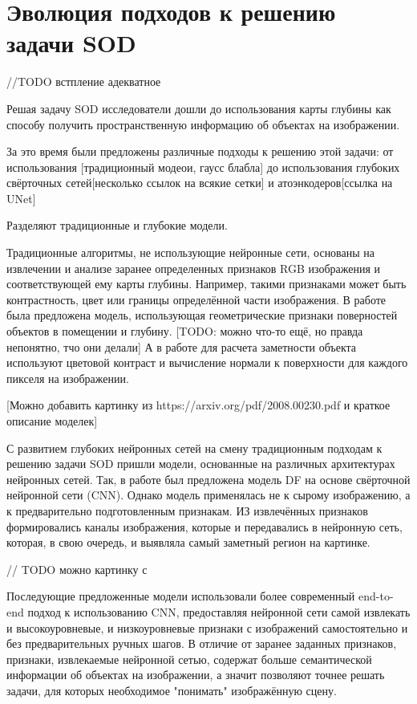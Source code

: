 \section{Эволюция подходов к решению задачи SOD}

//TODO встпление адекватное

Решая задачу SOD исследователи дошли до использования карты глубины как способу получить пространственную информацию об объектах на изображении.

За это время были предложены различные подходы к решению этой задачи: от использования [традиционный модеои, гаусс блабла] до использования глубоких свёрточных сетей[несколько ссылок на всякие сетки] и атоэнкодеров[ссылка на UNet]

Разделяют традиционные и глубокие модели.


Традиционные алгоритмы, не использующие нейронные сети, основаны на извлечении и анализе заранее определенных признаков RGB изображения и соответствующей ему карты глубины.
Например, такими признаками может быть контрастность, цвет или границы определённой части изображения. 
В работе \cite{Depth-really-Matters} была предложена модель, использующая геометрические признаки поверностей объектов в помещении и глубину. 
[TODO: можно что-то ещё, но правда непонятно, тчо они делали]
А в работе \cite{Depth-View-of-Saliency} для расчета заметности объекта используют цветовой контраст и вычисление нормали к поверхности\cite{Surface-Normal} для каждого пикселя на изображении.


[Можно добавить картинку из https://arxiv.org/pdf/2008.00230.pdf и краткое описание моделек]


С развитием глубоких нейронных сетей на смену традиционным подходам к решению задачи SOD пришли модели, основанные на различных архитектурах нейронных сетей.
Так, в работе \cite{RGBD-SOD-Deep-Fusion} был предложена модель DF на основе свёрточной нейронной сети (CNN). Однако модель применялась не к сырому изображению, 
а к предварительно подготовленным признакам. ИЗ извлечённых признаков формировались каналы изображения, которые и передавались в нейронную сеть, которая, в свою очередь,
и выявляла самый заметный регион на картинке.

// TODO можно картинку с  \cite{RGBD-SOD-Deep-Fusion}


Последующие предложенные модели использовали более современный end-to-end подход к использованию CNN, предоставляя нейронной сети самой извлекать 
и высокоуровневые, и низкоуровневые признаки с изображений самостоятельно и без предварительных ручных шагов.
В отличие от заранее заданных признаков, признаки, извлекаемые нейронной сетью, содержат больше семантической информации об объектах на изображении, а значит
позволяют точнее решать задачи, для которых необходимое "понимать" изображённую сцену. 

